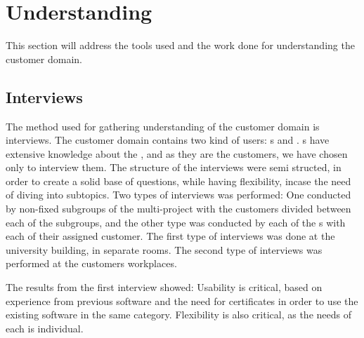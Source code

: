 \section{Understanding}
This section will address the tools used and the work done for understanding the customer domain.

\subsection{Interviews}
The method used for gathering understanding of the customer domain is interviews. 
The customer domain contains two kind of users: \guardian[c]s and \autists[].
\guardian[c]s have extensive knowledge about the \autists[], and as they are the customers, we have chosen only to interview them.
The structure of the interviews were semi structed, in order to create a solid base of questions, while having flexibility, incase the need of diving into subtopics. 
Two types of interviews was performed: One conducted by non-fixed subgroups of the multi-project with the customers divided between each of the subgroups, and the other type was conducted by each of the \localgroup{}s with each of their assigned customer. 
The first type of interviews was done at the university building, in separate rooms. 
The second type of interviews was performed at the customers workplaces. 

The results from the first interview showed: Usability is critical, based on experience from previous software and the need for certificates in order to use the existing software in the same category. Flexibility is also critical, as the needs of each \autist[] is individual. 

